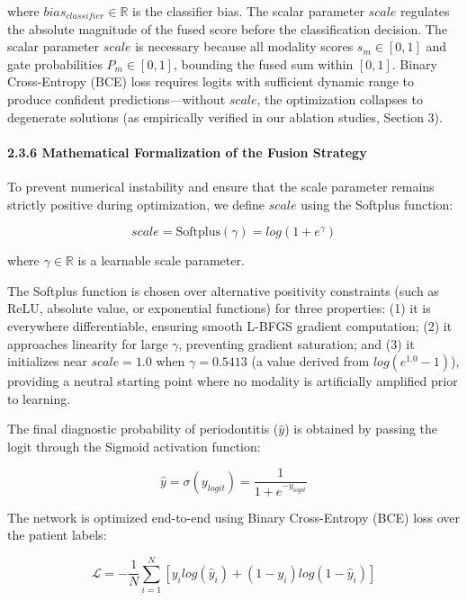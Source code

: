 \documentclass[
]{article}
\begin{document}
where \(bias_{classifier}\mathbb{\in R}\) is the classifier bias. The
scalar parameter \(scale\) regulates the absolute magnitude of the fused
score before the classification decision. The scalar parameter \(scale\)
is necessary because all modality scores \(s_{m} \in [ 0,1]\) and gate
probabilities \(P_{m} \in [ 0,1]\), bounding the fused sum within
\([ 0,1]\). Binary Cross-Entropy (BCE) loss requires logits with
sufficient dynamic range to produce confident predictions---without
\(scale\), the optimization collapses to degenerate solutions (as
empirically verified in our ablation studies, Section 3).

\paragraph{\texorpdfstring{\textbf{2.3.6 Mathematical Formalization of
the Fusion
Strategy}}{2.3.6 Mathematical Formalization of the Fusion Strategy}}\label{mathematical-formalization-of-the-fusion-strategy}

To prevent numerical instability and ensure that the scale parameter
remains strictly positive during optimization, we define \(scale\) using
the Softplus function:

\[scale = \text{Softplus}(\gamma) = log(1 + e^{\gamma})\]

where \(\gamma\mathbb{\in R}\) is a learnable scale parameter.

The Softplus function is chosen over alternative positivity constraints
(such as ReLU, absolute value, or exponential functions) for three
properties: (1) it is everywhere differentiable, ensuring smooth L-BFGS
gradient computation; (2) it approaches linearity for large \(\gamma\),
preventing gradient saturation; and (3) it initializes near
\(scale = 1.0\) when \(\gamma = 0.5413\) (a value derived from
\(log(e^{1.0} - 1)\)), providing a neutral starting point where no
modality is artificially amplified prior to learning.

The final diagnostic probability of periodontitis (\(\widehat{y}\)) is
obtained by passing the logit through the Sigmoid activation function:

\[\widehat{y} = \sigma(y_{logit}) = \frac{1}{1 + e^{- y_{logit}}}\]

The network is optimized end-to-end using Binary Cross-Entropy (BCE)
loss over the patient labels:

\[\mathcal{L = -}\frac{1}{N}\sum_{i = 1}^{N}\left[ y_{i}log({\widehat{y}}_{i}) + (1 - y_{i})log(1 - {\widehat{y}}_{i}) \right]\]
\end{document}
